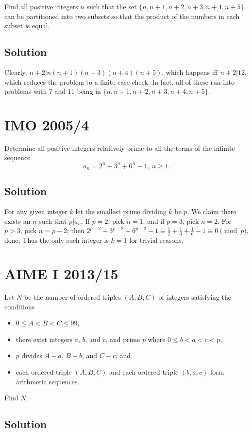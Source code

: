 \documentclass[mast]{lucky}
\begin{document}
Find all positive integers $n$ such that the set $\{n,n+1,n+2,n+3,n+4,n+5\}$ can be partitioned into two subsets so that the product of the numbers in each subset is equal.

\subsection{Solution}
Clearly, $n+2 | n(n+1)(n+3)(n+4)(n+5)$, which happens iff $n+2 | 12$, which reduces the problem to a finite case check. In fact, all of these run into problems with $7$ and $11$ being in $\{n,n+1,n+2,n+3,n+4,n+5\}$.

\pagebreak\section{IMO 2005/4}

Determine all positive integers relatively prime to all the terms of the infinite sequence
\[a_n=2^n+3^n+6^n -1,\ n\geq 1.\]

\subsection{Solution}
For any given integer $k$ let the smallest prime dividing $k$ be $p$. We claim there exists an $n$ such that $p|a_n$. If $p=2$, pick $n=1$, and if $p = 3$, pick $n=2$. For $p > 3$, pick $n = p-2$; then $2^{p-2} + 3^{p-2} + 6^{p-2} - 1 \equiv \frac12 + \frac13 + \frac16 - 1 \equiv 0 \pmod{p}$, done. Thus the only such integer is $k=1$ for trivial reasons.
\pagebreak\section{AIME I 2013/15}

Let $N$ be the number of ordered triples $(A,B,C)$ of integers satisfying the conditions
\begin{itemize}
\item $0\le A<B<C\le99$,
\item there exist integers $a$, $b$, and $c$, and prime $p$ where $0\le b<a<c<p$,
\item $p$ divides $A-a$, $B-b$, and $C-c$, and
\item each ordered triple $(A,B,C)$ and each ordered triple $(b,a,c)$ form arithmetic sequences.
\end{itemize}
Find $N$.

\subsection{Solution}
\end{document}
